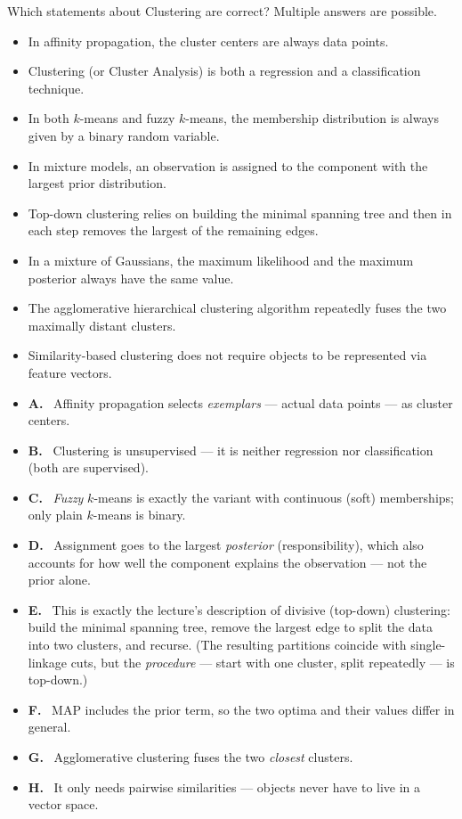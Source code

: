 \documentclass[11pt,oneside]{article}
\newcounter{question}
\newcommand{\questiontitle}[1]{%
  \stepcounter{question}\begin{qbox}[Question \thequestion: #1]}
\newcommand{\closequestion}{\end{qbox}}
\newcommand{\choice}{\item[$\square$] }
\newenvironment{answer}[1]{%
  \begin{keybox}[Answer]%
  \begin{itemize}[leftmargin=1.7em,itemsep=1.5pt,topsep=2pt]}%
  {\end{itemize}\end{keybox}}
\newcommand{\yes}[1]{\item[\textcolor{ok}{\ensuremath{\checkmark}}]\textbf{#1.}\ }
\newcommand{\no}[1]{\item[\textcolor{bad}{\ensuremath{\bm\times}}]\textbf{#1.}\ }
\begin{document}
\questiontitle{Clustering --- version A}
Which statements about Clustering are correct?
Multiple answers are possible.
\begin{itemize}
  \choice In affinity propagation, the cluster centers are always data points.
  \choice Clustering (or Cluster Analysis) is both a regression and a classification technique.
  \choice In both $k$-means and fuzzy $k$-means, the membership distribution is always given by a binary random variable.
  \choice In mixture models, an observation is assigned to the component with the largest prior distribution.
  \choice Top-down clustering relies on building the minimal spanning tree and then in each step removes the largest of the remaining edges.
  \choice In a mixture of Gaussians, the maximum likelihood and the maximum posterior always have the same value.
  \choice The agglomerative hierarchical clustering algorithm repeatedly fuses the two maximally distant clusters.
  \choice Similarity-based clustering does not require objects to be represented via feature vectors.
\end{itemize}
\closequestion
\begin{answer}{A, E, H}
  \yes{A} Affinity propagation selects \emph{exemplars} --- actual data points --- as cluster centers.
  \no{B} Clustering is unsupervised --- it is neither regression nor classification (both are supervised).
  \no{C} \emph{Fuzzy} $k$-means is exactly the variant with continuous (soft) memberships; only plain $k$-means is binary.
  \no{D} Assignment goes to the largest \emph{posterior} (responsibility), which also accounts for how well the component explains the observation --- not the prior alone.
  \yes{E} This is exactly the lecture's description of divisive (top-down) clustering:
  build the minimal spanning tree, remove the largest edge to split the data into two
  clusters, and recurse. (The resulting partitions coincide with single-linkage cuts,
  but the \emph{procedure} --- start with one cluster, split repeatedly --- is top-down.)
  \no{F} MAP includes the prior term, so the two optima and their values differ in general.
  \no{G} Agglomerative clustering fuses the two \emph{closest} clusters.
  \yes{H} It only needs pairwise similarities --- objects never have to live in a vector space.
\end{answer}
\end{document}

